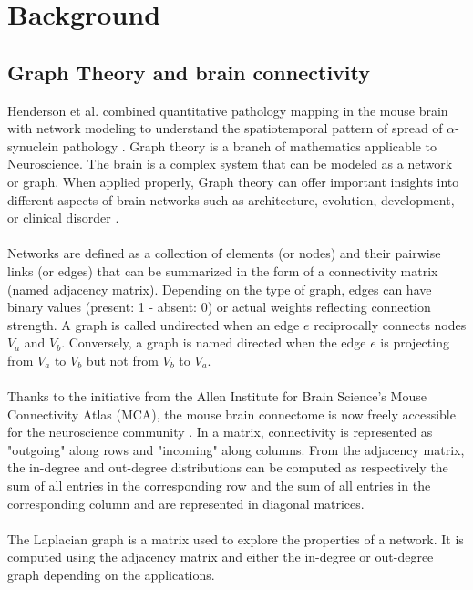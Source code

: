 \section{Background}
\subsection{Graph Theory and brain connectivity}
Henderson et al. combined quantitative pathology mapping in the mouse brain with network modeling to understand the spatiotemporal pattern of spread of  $\alpha$-synuclein pathology \cite{Henderson_2019}. Graph theory is a branch of mathematics applicable to Neuroscience. The brain is a complex system that can be modeled as a network or graph. When applied properly, Graph theory can offer important insights into different aspects of brain networks such as architecture, evolution, development, or clinical disorder \cite{Sporns_2018}.\\
\\
Networks are defined as a collection of elements (or nodes) and their pairwise links (or edges) that can be summarized in the form of a connectivity matrix (named adjacency matrix). Depending on the type of graph, edges can have binary values (present: 1 - absent: 0) or actual weights reflecting connection strength. A graph is called undirected when an edge $e$ reciprocally connects nodes $V_{a}$ and $V_{b}$. Conversely, a graph is named directed when the edge $e$ is projecting from $V_{a}$ to $V_{b}$ but not from $V_{b}$ to $V_{a}$.\\
\\
Thanks to the initiative from the Allen Institute for Brain Science's Mouse Connectivity Atlas (MCA), the mouse brain connectome is now freely accessible for the neuroscience community \cite{Oh_2014}. In a matrix, connectivity is represented as "outgoing" along  rows and "incoming" along  columns. From the adjacency matrix, the in-degree and out-degree distributions can be computed as respectively the sum of all entries in the corresponding row and the sum of all entries in the corresponding column and are represented in diagonal matrices.\\
\\
The Laplacian graph is a matrix used to explore the properties of a network. It is computed using the adjacency matrix and either the in-degree or out-degree graph depending on the applications.

